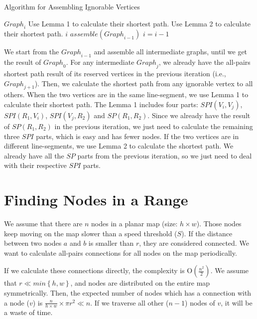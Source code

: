\begin{algorithm} [hbtp]
\caption{Algorithm for Assembling Ignorable Vertices}\label{AlgAssIgnVer}
\begin{algorithmic}[1]
 {${Graph}_i$}
			\State Use Lemma 1 to calculate their shortest path.
		\Else
			\State Use Lemma 2 to calculate their shortest path.
		\EndIf
	\EndFor
\EndFor
\EndProcedure
{} {$i$}
	\State $assemble\left({Graph}_{i-1}\right)$
	\State $i=i-1$
\EndWhile
\EndProcedure
\end{algorithmic}
\end{algorithm}

\noindent We start from the ${Graph}_{i-1}$ and assemble all intermediate graphs, until we get the result of ${Graph}_0$. For any intermediate ${Graph}_j$, we already have the all-pairs shortest path result of its reserved vertices in the previous iteration (i.e., ${Graph}_{j+1}$). Then, we calculate the shortest path from any ignorable vertex to all others. When the two vertices are in the same line-segment, we use Lemma 1 to calculate their shortest path. The Lemma 1 includes four parts: $SPI\left(V_i,V_j\right)$, $SPI\left(R_1,V_i\right)$, $SPI\left(V_j,R_2\right)$ and $SP\left(R_1,R_2\right)$. Since we already have the result of $SP\left(R_1,R_2\right)$ in the previous iteration, we just need to calculate the remaining three $SPI$ parts, which is easy and has fewer nodes. If the two vertices are in different line-segments, we use Lemma 2 to calculate the shortest path. We already have all the $SP$ parts from the previous iteration, so we just need to deal with their respective $SPI$ parts.


\section{ Finding Nodes in a Range}

\noindent We assume that there are $n$ nodes in a planar map (size: $h\times w$). Those nodes keep moving on the map slower than a speed threshold ($S$). If the distance between two nodes $a$ and $b$ is smaller than $r$, they are considered connected. We want to calculate all-pairs connections for all nodes on the map periodically. 

If we calculate these connections directly, the complexity is $\mathrm{O}\left(\frac{n^2}{2}\right)$. We assume that $r\ll min\left\{h,w\right\}$, and nodes are distributed on the entire map symmetrically. Then, the expected number of nodes which has a connection with a node ($v$) is $\frac{n}{h\times w}\times\pi r^2\ll n$. If we traverse all other ($n-1$) nodes of $v$, it will be a waste of time.


